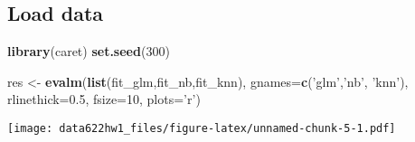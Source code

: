 \documentclass[
]{article}
\newenvironment{Shaded}{\begin{snugshade}}{\end{snugshade}}
\newcommand{\DataTypeTok}[1]{\textcolor[rgb]{0.13,0.29,0.53}{#1}}
\newcommand{\DecValTok}[1]{\textcolor[rgb]{0.00,0.00,0.81}{#1}}
\newcommand{\FloatTok}[1]{\textcolor[rgb]{0.00,0.00,0.81}{#1}}
\newcommand{\KeywordTok}[1]{\textcolor[rgb]{0.13,0.29,0.53}{\textbf{#1}}}
\newcommand{\NormalTok}[1]{#1}
\newcommand{\StringTok}[1]{\textcolor[rgb]{0.31,0.60,0.02}{#1}}
\begin{document}
\hypertarget{load-data-1}{%
\subsection{Load data}\label{load-data-1}}

\begin{Shaded}
\begin{Highlighting}[]
\KeywordTok{library}\NormalTok{(caret)}
\KeywordTok{set.seed}\NormalTok{(}\DecValTok{300}\NormalTok{)}
\end{Highlighting}
\end{Shaded}

\begin{Shaded}
\begin{Highlighting}[]
\NormalTok{res <-}\StringTok{ }\KeywordTok{evalm}\NormalTok{(}\KeywordTok{list}\NormalTok{(fit_glm,fit_nb,fit_knn), }\DataTypeTok{gnames=}\KeywordTok{c}\NormalTok{(}\StringTok{'glm'}\NormalTok{,}\StringTok{'nb'}\NormalTok{, }\StringTok{'knn'}\NormalTok{), }\DataTypeTok{rlinethick=}\FloatTok{0.5}\NormalTok{, }\DataTypeTok{fsize=}\DecValTok{10}\NormalTok{, }\DataTypeTok{plots=}\StringTok{'r'}\NormalTok{)}
\end{Highlighting}
\end{Shaded}

\texttt{[image: data622hw1\_files/figure-latex/unnamed-chunk-5-1.pdf]}
\end{document}
